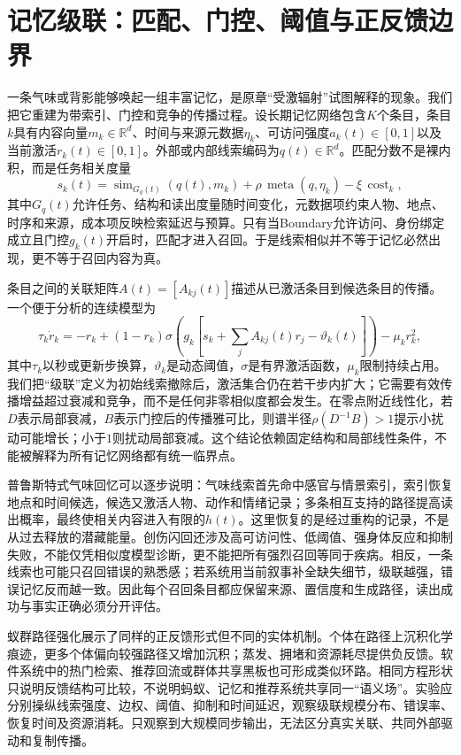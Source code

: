 \section{记忆级联：匹配、门控、阈值与正反馈边界}
\label{sec:stimulated_emission_of_cognition}

一条气味或背影能够唤起一组丰富记忆，是原章“受激辐射”试图解释的现象。我们把它重建为带索引、门控和竞争的传播过程。设长期记忆网络包含$K$个条目，条目$k$具有内容向量$m_k\in\mathbb R^d$、时间与来源元数据$\eta_k$、可访问强度$a_k(t)\in[0,1]$以及当前激活$r_k(t)\in[0,1]$。外部或内部线索编码为$q(t)\in\mathbb R^d$。匹配分数不是裸内积，而是任务相关度量
\begin{equation}
s_k(t)=\operatorname{sim}_{G_q(t)}(q(t),m_k)+\rho\,\operatorname{meta}(q,\eta_k)-\xi\,\operatorname{cost}_k,
\end{equation}
其中$G_q(t)$允许任务、结构和读出度量随时间变化，元数据项约束人物、地点、时序和来源，成本项反映检索延迟与预算。只有当Boundary允许访问、身份绑定成立且门控$g_k(t)$开启时，匹配才进入召回。于是线索相似并不等于记忆必然出现，更不等于召回内容为真。

条目之间的关联矩阵$A(t)=[A_{kj}(t)]$描述从已激活条目到候选条目的传播。一个便于分析的连续模型为
\begin{equation}
\tau_k\dot r_k=-r_k+(1-r_k)\sigma\!\left(g_k\left[s_k+\sum_j A_{kj}(t)r_j-\vartheta_k(t)\right]\right)-\mu_k r_k^2,
\end{equation}
其中$\tau_k$以秒或更新步换算，$\vartheta_k$是动态阈值，$\sigma$是有界激活函数，$\mu_k$限制持续占用。我们把“级联”定义为初始线索撤除后，激活集合仍在若干步内扩大；它需要有效传播增益超过衰减和竞争，而不是任何非零相似度都会发生。在零点附近线性化，若$D$表示局部衰减，$B$表示门控后的传播雅可比，则谱半径$\rho(D^{-1}B)>1$提示小扰动可能增长；小于$1$则扰动局部衰减。这个结论依赖固定结构和局部线性条件，不能被解释为所有记忆网络都有统一临界点。

普鲁斯特式气味回忆可以逐步说明：气味线索首先命中感官与情景索引，索引恢复地点和时间候选，候选又激活人物、动作和情绪记录；多条相互支持的路径提高读出概率，最终使相关内容进入有限的$h(t)$。这里恢复的是经过重构的记录，不是从过去释放的潜藏能量。创伤闪回还涉及高可访问性、低阈值、强身体反应和抑制失败，不能仅凭相似度模型诊断，更不能把所有强烈召回等同于疾病。相反，一条线索也可能只召回错误的熟悉感；若系统用当前叙事补全缺失细节，级联越强，错误记忆反而越一致。因此每个召回条目都应保留来源、置信度和生成路径，读出成功与事实正确必须分开评估。

蚁群路径强化展示了同样的正反馈形式但不同的实体机制。个体在路径上沉积化学痕迹，更多个体偏向较强路径又增加沉积；蒸发、拥堵和资源耗尽提供负反馈。软件系统中的热门检索、推荐回流或群体共享黑板也可形成类似环路。相同方程形状只说明反馈结构可比较，不说明蚂蚁、记忆和推荐系统共享同一“语义场”。实验应分别操纵线索强度、边权、阈值、抑制和时间延迟，观察级联规模分布、错误率、恢复时间及资源消耗。只观察到大规模同步输出，无法区分真实关联、共同外部驱动和复制传播。

